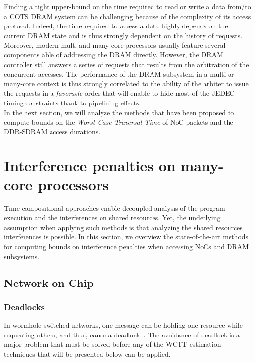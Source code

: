 \documentclass[main.tex]{subfiles}
\begin{document}
Finding a tight upper-bound on the time required to read or write a data
from/to a COTS DRAM system can be challenging because of the complexity of its
access protocol. Indeed, the time required to access a data highly depends on
the current DRAM state and is thus strongly dependent on the history of
requests. Moreover, modern multi and many-core processors usually feature
several components able of addressing the DRAM directly. However, the DRAM
controller still answers a series of requests that results from the arbitration
of the concurrent accesses. The performance of the DRAM subsystem in a multi or
many-core context is thus strongly correlated to the ability of the arbiter to
issue the requests in a \emph{favorable} order that will enable to hide most of
the JEDEC timing constraints thank to pipelining effects. \\

In the next section, we will analyze the methods that have been proposed to
compute bounds on the \emph{Worst-Case Traversal Time} of NoC packets and the
DDR-SDRAM access durations.



\section{Interference penalties on many-core processors}
\label{sec_stateOfTheArt_interferencePenalties}

Time-compositional approaches enable decoupled analysis of the program
execution and the interferences on shared resources. Yet, the underlying
assumption when applying such methods is that analyzing the shared resources
interferences is possible. In this section, we overview the state-of-the-art
methods for computing bounds on interference penalties when accessing NoCs and
DRAM subsystems.

\subsection{Network on Chip}
\label{sssec_stateOfTheArt_Noc_timingguarantees}

\subsubsection{Deadlocks}
\label{sssec_stateOfTheArt_Noc_deadlocks}
In wormhole switched networks, one message can be holding one resource while
requesting others, and thus, cause a deadlock~\cite{Duato1993, Fleury98}. The
avoidance of deadlock is a major problem that must be solved before any of the
WCTT estimation techniques that will be presented below can be applied.
\end{document}
